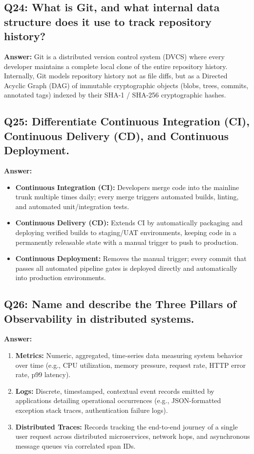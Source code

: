 \subsection*{Q24: What is Git, and what internal data structure does it use to track repository history?}
\textbf{Answer:} Git is a distributed version control system (DVCS) where every developer maintains a complete local clone of the entire repository history. Internally, Git models repository history not as file diffs, but as a Directed Acyclic Graph (DAG) of immutable cryptographic objects (blobs, trees, commits, annotated tags) indexed by their SHA-1 / SHA-256 cryptographic hashes.

\subsection*{Q25: Differentiate Continuous Integration (CI), Continuous Delivery (CD), and Continuous Deployment.}
\textbf{Answer:}
\begin{itemize}
    \item \textbf{Continuous Integration (CI):} Developers merge code into the mainline trunk multiple times daily; every merge triggers automated builds, linting, and automated unit/integration tests.
    \item \textbf{Continuous Delivery (CD):} Extends CI by automatically packaging and deploying verified builds to staging/UAT environments, keeping code in a permanently releasable state with a manual trigger to push to production.
    \item \textbf{Continuous Deployment:} Removes the manual trigger; every commit that passes all automated pipeline gates is deployed directly and automatically into production environments.
\end{itemize}

\subsection*{Q26: Name and describe the Three Pillars of Observability in distributed systems.}
\textbf{Answer:}
\begin{enumerate}[label=\arabic*.]
    \item \textbf{Metrics:} Numeric, aggregated, time-series data measuring system behavior over time (e.g., CPU utilization, memory pressure, request rate, HTTP error rate, p99 latency).
    \item \textbf{Logs:} Discrete, timestamped, contextual event records emitted by applications detailing operational occurrences (e.g., JSON-formatted exception stack traces, authentication failure logs).
    \item \textbf{Distributed Traces:} Records tracking the end-to-end journey of a single user request across distributed microservices, network hops, and asynchronous message queues via correlated span IDs.
\end{enumerate}

